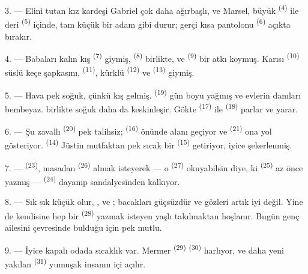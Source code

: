 3. --- Elini tutan kız kardeşi Gabriel çok daha ağırbaşlı, ve Marsel, büyük
 \textsuperscript{(4)} ile deri 
\textsuperscript{(5)} içinde, tam küçük bir adam gibi durur; gerçi kısa
pantolonu  \textsuperscript{(6)} açıkta bırakır.

4. --- Babaları kalın kış  \textsuperscript{(7)} giymiş,
 \textsuperscript{(8)} birlikte, ve 
\textsuperscript{(9)} bir atkı koymuş. Karısı 
\textsuperscript{(10)} süslü keçe şapkasını, 
\textsuperscript{(11)}, kürklü  \textsuperscript{(12)} ve
 \textsuperscript{(13)} giymiş.

5. --- Hava pek soğuk, çünkü kış gelmiş. 
\textsuperscript{(19)} gün boyu yağmış ve evlerin damları bembeyaz.
 birlikte soğuk daha da keskinleşir. Gökte 
\textsuperscript{(17)} ile  \textsuperscript{(18)} parlar ve
 yarar.

\VUsaut{4.2mm}
\VUsaut{3.0mm}

6. --- Şu zavallı  \textsuperscript{(20)} pek talihsiz;
 \textsuperscript{(16)} önünde alanı geçiyor ve
 \textsuperscript{(21)} ona yol gösteriyor. 
\textsuperscript{(14)} Jüstin mutfaktan pek sıcak bir 
\textsuperscript{(15)}  getiriyor, iyice şekerlenmiş.

7. ---  \textsuperscript{(23)}, masadan
 \textsuperscript{(26)} almak isteyerek --- o
 \textsuperscript{(27)} okuyabilsin diye, ki
 \textsuperscript{(25)} az önce yazmış ---
 \textsuperscript{(24)} dayanıp sandalyesinden kalkıyor.

8. --- Sık sık küçük  olur, ,
 ve ; bacakları güçsüzdür ve gözleri artık
iyi değil. Yine de kendisine hep bir  \textsuperscript{(28)}
yazmak isteyen yaşlı  takılmaktan hoşlanır. Bugün genç
ailesini çevresinde bulduğu için pek mutlu.

9. --- İyice kapalı odada sıcaklık var. Mermer 
\textsuperscript{(29)}  \textsuperscript{(30)} harlıyor,
ve daha yeni yakılan  \textsuperscript{(31)} yumuşak
 insanın içi açılır.

